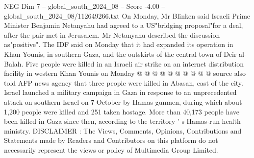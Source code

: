 \begin{textsample}{NEG Dim 7 – global\_south\_2024\_08 – Score -4.00 – global\_south\_2024\_08/112649266.txt}
On Monday, Mr Blinken said Israeli Prime Minister Benjamin Netanyahu had agreed to a US"bridging proposal"for a deal, after the pair met in Jerusalem.
Mr Netanyahu described the discussion as"positive".
The IDF said on Monday that it had expanded its operation in Khan Younis, in southern Gaza, and the outskirts of the central town of Deir al-Balah.
Five people were killed in an Israeli air strike on an internet distribution facility in western Khan Younis on Monday @ @ @ @ @ @ @ @ @ @ source also told AFP news agency that three people were killed in Abasan, east of the city.
Israel launched a military campaign in Gaza in response to an unprecedented attack on southern Israel on 7 October by Hamas gunmen, during which about 1,200 people were killed and 251 taken hostage.
More than 40,173 people have been killed in Gaza since then, according to the territory ' s Hamas-run health ministry.
DISCLAIMER : The Views, Comments, Opinions, Contributions and Statements made by Readers and Contributors on this platform do not necessarily represent the views or policy of Multimedia Group Limited.

\end{textsample}
